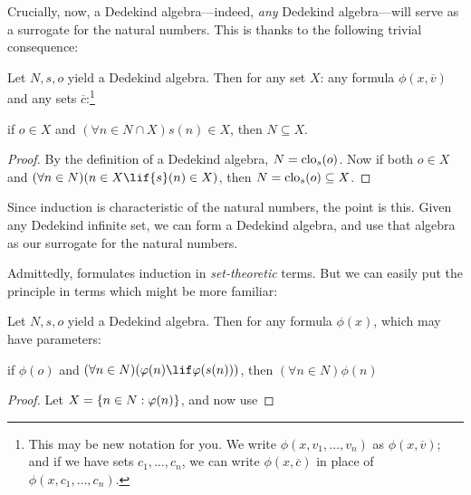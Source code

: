\documentclass[../../../include/open-logic-section]{subfiles}
\begin{document}

Crucially, now, a Dedekind algebra---indeed, \emph{any} Dedekind
algebra---will serve as a surrogate for the natural numbers. This is
thanks to the following trivial consequence:

\begin{thm}
Let $N, s, o$ yield a Dedekind algebra. Then for any set $X$: %
any formula $\phi(x, \overline{v})$ and any sets
$\overline{c}$:\footnote{This may be new notation for you. We write
$\phi(x, v_1, \ldots, v_n)$ as $\phi(x, \overline{v})$; and if we have
sets $c_1, \ldots, c_n$, we can write $\phi(x, \overline{c})$ in place
of $\phi(x, c_1, \ldots, c_n)$.} 
	\begin{center}
		if $o \in X$ and $(\forall {n} \in N \cap X){s}({n}) \in X$, {then} $N \subseteq X$.
	\end{center}
\end{thm}

\begin{proof}
By the definition of a Dedekind algebra, $N = \mathrm{clo}_{s}(o)$.
Now if both ${o} \in X$ and $(\forall {n} \in N)(n \in X \lif
{s}({n}) \in X)$, then $N = \mathrm{clo}_{s}(o) \subseteq X$.
\end{proof}

Since induction is characteristic of the natural numbers, the point is
this. Given any Dedekind infinite set, we can form a Dedekind algebra,
and use that algebra as our surrogate for the natural numbers. 

Admittedly,  formulates induction in
\emph{set-theoretic} terms. But we can easily put the principle in
terms which might be more familiar:

\begin{cor}
Let $N, s, o$ yield a Dedekind algebra. Then for any formula
$\phi(x)$, which may have parameters:
\begin{center}
	if $\phi(o)$ and $(\forall {n} \in N)(\phi(n)\lif
	\phi({s}({n})))$, {then} $(\forall n \in N)\phi(n)$
\end{center}
\end{cor}

\begin{proof}
Let $X = \{ n \in N : \varphi(n) \}$, and now use
\end{proof}
\end{document}

